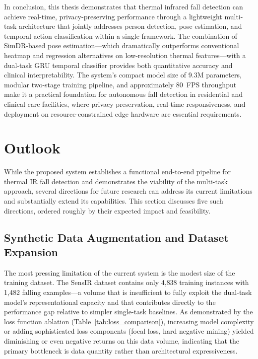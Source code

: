 In conclusion, this thesis demonstrates that thermal infrared fall detection can achieve real-time, privacy-preserving performance through a lightweight multi-task architecture that jointly addresses person detection, pose estimation, and temporal action classification within a single framework. The combination of SimDR-based pose estimation---which dramatically outperforms conventional heatmap and regression alternatives on low-resolution thermal features---with a dual-task GRU temporal classifier provides both quantitative accuracy and clinical interpretability. The system's compact model size of 9.3M parameters, modular two-stage training pipeline, and approximately 80~FPS throughput make it a practical foundation for autonomous fall detection in residential and clinical care facilities, where privacy preservation, real-time responsiveness, and deployment on resource-constrained edge hardware are essential requirements.

\section{Outlook}
\label{sec:outlook}

While the proposed system establishes a functional end-to-end pipeline for thermal IR fall detection and demonstrates the viability of the multi-task approach, several directions for future research can address its current limitations and substantially extend its capabilities. This section discusses five such directions, ordered roughly by their expected impact and feasibility.

\subsection{Synthetic Data Augmentation and Dataset Expansion}
\label{sec:outlook_synth}

The most pressing limitation of the current system is the modest size of the training dataset. The SensIR dataset contains only 4{,}838 training instances with 1{,}482 falling examples---a volume that is insufficient to fully exploit the dual-task model's representational capacity and that contributes directly to the performance gap relative to simpler single-task baselines. As demonstrated by the loss function ablation (Table~\ref{tab:loss_comparison}), increasing model complexity or adding sophisticated loss components (focal loss, hard negative mining) yielded diminishing or even negative returns on this data volume, indicating that the primary bottleneck is data quantity rather than architectural expressiveness.


